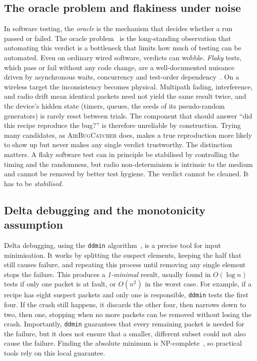 \subsection{The oracle problem and flakiness under noise}

In software testing, the \emph{oracle} is the mechanism that decides whether a run
passed or failed. The oracle problem~\cite{oracleproblem2015} is the long-standing
observation that automating this verdict is a bottleneck that limits how much of
testing can be automated. Even on ordinary wired software, verdicts can wobble. \emph{Flaky}
tests, which pass or fail without any code change, are a well-documented nuisance
driven by asynchronous waits, concurrency and test-order dependency~\cite{flakytests2014}. On a
wireless target the inconsistency becomes physical. Multipath fading, interference,
and radio drift mean identical packets need not yield the same result twice, and
the device's hidden state (timers, queues, the seeds of its pseudo-random
generators) is rarely reset between trials. The component that should answer
``did this recipe reproduce the bug?'' is therefore unreliable by construction.
Trying many candidates, as \textsc{AirBugCatcher} does, makes a true reproduction
more likely to show up but never makes any single verdict trustworthy. The distinction
matters. A flaky software test can in principle be stabilised by controlling the
timing and the randomness, but radio non-determinism is intrinsic to the medium
and cannot be removed by better test hygiene. The verdict cannot be cleaned. It
has to be \emph{stabilised}.

\subsection{Delta debugging and the monotonicity assumption}

Delta debugging, using the \texttt{ddmin} algorithm~\cite{ddmin2002}, is a precise
tool for input minimisation. It works by splitting the suspect elements, keeping
the half that still causes failure, and repeating this process until removing any
single element stops the failure. This produces a \emph{1-minimal} result, usually
found in $O(\log n)$ tests if only one packet is at fault, or $O(n^2)$ in the
worst case. For example, if a recipe has eight suspect packets and only one is
responsible, \texttt{ddmin} tests the first four. If the crash still happens, it
discards the other four, then narrows down to two, then one, stopping when no more
packets can be removed without losing the crash. Importantly, \texttt{ddmin}
guarantees that every remaining packet is needed for the failure, but it does not
ensure that a smaller, different subset could not also cause the failure. Finding
the absolute minimum is NP-complete~\cite{hdd2006}, so practical tools rely on
this local guarantee.

